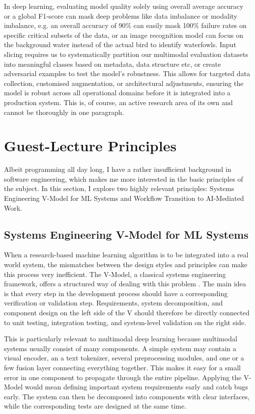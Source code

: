 \documentclass[11pt,a4paper]{article}
\begin{document}
In deep learning, evaluating model quality solely using overall average accuracy or a global F1-score can mask deep problems like data imbalance or modality imbalance, e.g. an overall accuracy of 90\% can easily mask 100\% failure rates on specific critical subsets of the data, or an image recognition model can focus on the background water instead of the actual bird to identify waterfowls. Input slicing requires us to systematically partition our multimodal evaluation datasets into meaningful classes based on metadata, data structure etc, or create adversarial examples to test the model's robustness. This allows for targeted data collection, customised augmentation, or architectural adjustments, ensuring the model is robust across all operational domains before it is integrated into a production system. This is, of course, an active research area of its own and cannot be thoroughly in one paragraph.



\section{Guest-Lecture Principles}

Albeit programming all day long, I have a rather insufficient background in software engineering, which makes me more interested in the basic principles of the subject. In this section, I explore two highly relevant principles: Systems Engineering V-Model for ML Systems and Workflow Transition to AI-Mediated Work.

\subsection{Systems Engineering V-Model for ML Systems}

When a research-based machine learning algorithm is to be integrated into a real world system, the mismatches between the design styles and principles can make this process very inefficient. The V-Model, a classical systems engineering framework, offers a structured way of dealing with this problem \cite{wu2024exploratory}. The main idea is that every step in the development process should have a corresponding verification or validation step. Requirements, system decomposition, and component design on the left side of the V should therefore be directly connected to unit testing, integration testing, and system-level validation on the right side.

This is particularly relevant to multimodal deep learning because multimodal systems usually consist of many components. A simple system may contain a visual encoder, an a text tokenizer, several preprocessing modules, and one or a few fusion layer connecting everything together. This makes it easy for a small error in one component to propagate through the entire pipeline. Applying the V-Model would mean defining important system requirements early and catch bugs early. The system can then be decomposed into components with clear interfaces, while the corresponding tests are designed at the same time. 
\end{document}
